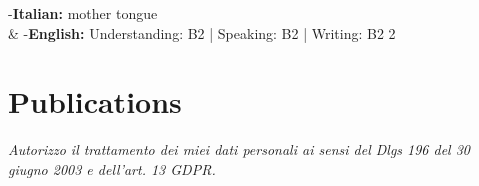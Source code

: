 \documentclass{fancy_cv}
\begin{document}
            {
                -\textbf{Italian:} mother tongue \\ &
                -\textbf{English:} Understanding: B2 | Speaking: B2 | Writing: B2
            }{2}
        \smallskip




    \section{Publications}
            \nocite{*}
            \printbibliography[heading=none]{}

        \vspace*{\fill}
        \emph{Autorizzo il trattamento dei miei dati personali ai sensi del Dlgs 196 del 30 giugno 2003 e dell’art. 13 GDPR.}
\end{document}
